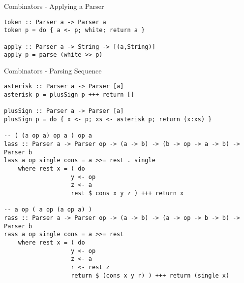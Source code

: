 \documentclass[12pt]{beamer}
\newcommand{\codesize}{\fontsize{7.7}{7.7}}
\begin{document}
\begin{spacing}{1.3}
\begin{frame}[fragile=singleslide]{Combinators - Applying a Parser}
\begin{verbatim}
token :: Parser a -> Parser a
token p = do { a <- p; white; return a }

apply :: Parser a -> String -> [(a,String)]
apply p = parse (white >> p)
\end{verbatim}
\end{frame}

\begin{frame}[fragile=singleslide]{Combinators - Parsing Sequence}
\begin{verbatim}
asterisk :: Parser a -> Parser [a]
asterisk p = plusSign p +++ return []

plusSign :: Parser a -> Parser [a]
plusSign p = do { x <- p; xs <- asterisk p; return (x:xs) }

-- ( (a op a) op a ) op a
lass :: Parser a -> Parser op -> (a -> b) -> (b -> op -> a -> b) -> Parser b
lass a op single cons = a >>= rest . single
    where rest x = ( do
                   y <- op
                   z <- a
                   rest $ cons x y z ) +++ return x

-- a op ( a op (a op a) )
rass :: Parser a -> Parser op -> (a -> b) -> (a -> op -> b -> b) -> Parser b
rass a op single cons = a >>= rest
    where rest x = ( do
                   y <- op
                   z <- a
                   r <- rest z
                   return $ (cons x y r) ) +++ return (single x)
\end{verbatim}
\end{frame}

\end{spacing}
\end{document}

